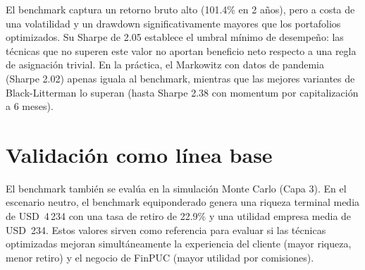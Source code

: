 El benchmark captura un retorno bruto alto (101.4\% en 2 a\~nos), pero a
costa de una volatilidad y un drawdown significativamente mayores que los
portafolios optimizados. Su Sharpe de 2.05 establece el umbral m\'inimo de
desempe\~no: las t\'ecnicas que no superen este valor no aportan beneficio
neto respecto a una regla de asignaci\'on trivial. En la pr\'actica, el
Markowitz con datos de pandemia (Sharpe 2.02) apenas iguala al benchmark,
mientras que las mejores variantes de Black-Litterman lo superan (hasta
Sharpe 2.38 con momentum por capitalizaci\'on a 6 meses).

\section{Validaci\'on como l\'inea base}

El benchmark tambi\'en se eval\'ua en la simulaci\'on Monte Carlo (Capa 3).
En el escenario neutro, el benchmark equiponderado genera una riqueza terminal
media de USD~4\,234 con una tasa de retiro de 22.9\% y una utilidad empresa
media de USD~234. Estos valores sirven como referencia para evaluar si las
t\'ecnicas optimizadas mejoran simult\'aneamente la experiencia del cliente
(mayor riqueza, menor retiro) y el negocio de FinPUC (mayor utilidad por
comisiones).